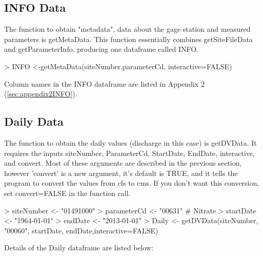 \documentclass[a4paper,11pt]{article}
\begin{document}
\subsection{INFO Data}
The function to obtain "metadata", data about the gage station and measured parameters is getMetaData. This function essentially combines getSiteFileData and getParameterInfo, producing one dataframe called INFO.

\begin{Schunk}
\begin{Sinput}
> INFO <-getMetaData(siteNumber,parameterCd, interactive=FALSE)
\end{Sinput}
\end{Schunk}

Column names in the INFO dataframe are listed in Appendix 2 (\ref{sec:appendix2INFO}).

\subsection{Daily Data}
The function to obtain the daily values (discharge in this case) is getDVData.  It requires the inputs siteNumber, ParameterCd, StartDate, EndDate, interactive, and convert. Most of these arguments are described in the previous section, however 'convert' is a new argument, it's default is TRUE, and it tells the program to convert the values from cfs to cms. If you don't want this conversion, set convert=FALSE in the function call.

\begin{Schunk}
\begin{Sinput}
> siteNumber <- "01491000"
> parameterCd <- "00631"  # Nitrate
> startDate <- "1964-01-01"
> endDate <- "2013-01-01"
> Daily <- getDVData(siteNumber, "00060", startDate, endDate,interactive=FALSE)
\end{Sinput}
\end{Schunk}

Details of the Daily dataframe are listed below:
\end{document}
